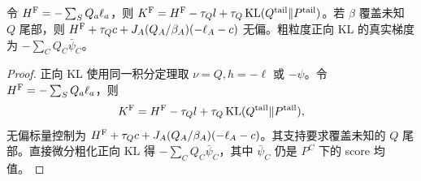 \begin{proposition}[正向 KL 的头尾校正]
令 $H^{\rm F}=-\sum_SQ_a\ell_a$，则 $K^{\rm F}=H^{\rm F}-\tau_Ql+\tau_Q\operatorname{KL}(Q^{\rm tail}\Vert P^{\rm tail})$。若 $\beta$ 覆盖未知 $Q$ 尾部，则 $H^{\rm F}+\tau_Qc+J_A(Q_A/\beta_A)(-\ell_A-c)$ 无偏。粗粒度正向 KL 的真实梯度为 $-\sum_CQ_C\bar\psi_C$。
\end{proposition}
\begin{proof}
正向 KL 使用同一积分定理取 $\nu=Q,h=-\ell$ 或 $-\psi$。令 $H^{\rm F}=-\sum_SQ_a\ell_a$，则
\begin{equation}
K^{\rm F}=H^{\rm F}-\tau_Ql+\tau_Q\operatorname{KL}(Q^{\rm tail}\Vert P^{\rm tail}),
\end{equation}
无偏标量控制为 $H^{\rm F}+\tau_Qc+J_A(Q_A/\beta_A)(-\ell_A-c)$。其支持要求覆盖未知的 $Q$ 尾部。直接微分粗化正向 KL 得 $-\sum_CQ_C\bar\psi_C$，其中 $\bar\psi_C$ 仍是 $P^C$ 下的 score 均值。
\end{proof}

